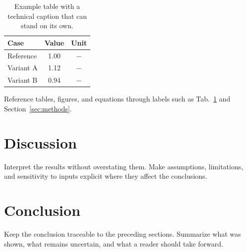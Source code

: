 \documentclass[11pt,a4paper]{article}
\begin{document}
\begin{onehalfspacing}
\begin{table}[htb]
  \centering
  \caption{Example table with a technical caption that can stand on its own.}
  \label{tab:example-results}
  \begin{tabular}{lcc}
    \toprule
    Case & Value & Unit \\
    \midrule
    Reference & 1.00 & $-$ \\
    Variant A & 1.12 & $-$ \\
    Variant B & 0.94 & $-$ \\
    \bottomrule
  \end{tabular}
\end{table}

Reference tables, figures, and equations through labels such as
Tab.~\ref{tab:example-results} and Section~\ref{sec:methods}.

\section{Discussion}
\label{sec:discussion}

Interpret the results without overstating them. Make assumptions, limitations,
and sensitivity to inputs explicit where they affect the conclusions.

\section{Conclusion}
\label{sec:conclusion}

Keep the conclusion traceable to the preceding sections. Summarize what was
shown, what remains uncertain, and what a reader should take forward.

\end{onehalfspacing}
\end{document}
